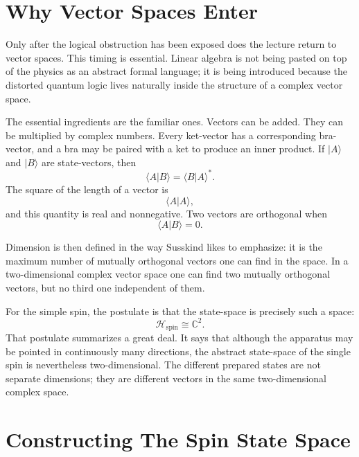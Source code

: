 \section{Why Vector Spaces Enter}

Only after the logical obstruction has been exposed does the lecture return to vector spaces. This timing is essential. Linear algebra is not being pasted on top of the physics as an abstract formal language; it is being introduced because the distorted quantum logic lives naturally inside the structure of a complex vector space.

The essential ingredients are the familiar ones. Vectors can be added. They can be multiplied by complex numbers. Every ket-vector has a corresponding bra-vector, and a bra may be paired with a ket to produce an inner product. If \(|A\rangle\) and \(|B\rangle\) are state-vectors, then
\begin{equation}
\langle A|B\rangle=\langle B|A\rangle^{*}.
\end{equation}
The square of the length of a vector is
\begin{equation}
\langle A|A\rangle,
\end{equation}
and this quantity is real and nonnegative. Two vectors are orthogonal when
\begin{equation}
\langle A|B\rangle=0.
\end{equation}

Dimension is then defined in the way Susskind likes to emphasize: it is the maximum number of mutually orthogonal vectors one can find in the space. In a two-dimensional complex vector space one can find two mutually orthogonal vectors, but no third one independent of them.

For the simple spin, the postulate is that the state-space is precisely such a space:
\begin{equation}
\mathcal H_{\text{spin}}\cong \mathbb C^2.
\end{equation}
That postulate summarizes a great deal. It says that although the apparatus may be pointed in continuously many directions, the abstract state-space of the single spin is nevertheless two-dimensional. The different prepared states are not separate dimensions; they are different vectors in the same two-dimensional complex space.

\section{Constructing The Spin State Space}

